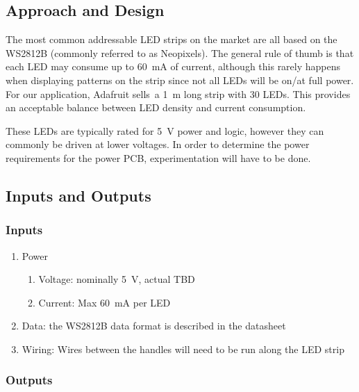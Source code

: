 \documentclass{notes}
\begin{document}
\subsection{Approach and Design}

The most common addressable LED strips on the market are all based on the WS2812B (commonly referred to as Neopixels).
The general rule of thumb is that each LED may consume up to \SI{60}{\milli\ampere} of current, although this rarely happens when displaying patterns on the strip since not all LEDs will be on/at full power.
For our application, Adafruit sells\footnotemark\ a \SI{1}{\meter} long strip with 30 LEDs.
This provides an acceptable balance between LED density and current consumption.

These LEDs are typically rated for \SI{5}{\volt} power and logic, however they can commonly be driven at lower voltages.
In order to determine the power requirements for the power PCB, experimentation will have to be done.

\subsection{Inputs and Outputs}

\subsubsection{Inputs}

\begin{enumerate}
    \item Power
          \begin{enumerate}
              \item Voltage: nominally \SI{5}{\volt}, actual TBD
              \item Current: Max \SI{60}{\milli\ampere} per LED
          \end{enumerate}
    \item Data: the WS2812B data format is described in the datasheet\footnotemark
    \item Wiring: Wires between the handles will need to be run along the LED strip
\end{enumerate}

\subsubsection{Outputs}
\end{document}
